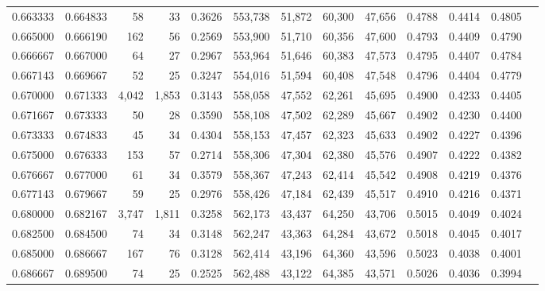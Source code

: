 \begin{tabular}{rrrrrrrrrrrrr}
0.663333 & 0.664833 &     58 &    33 &                                     0.3626 & 553,738 &  51,872 &  60,300 &  47,656 & 0.4788 & 0.4414 & 0.4805 \\
0.665000 & 0.666190 &    162 &    56 &                                     0.2569 & 553,900 &  51,710 &  60,356 &  47,600 & 0.4793 & 0.4409 & 0.4790 \\
0.666667 & 0.667000 &     64 &    27 &                                     0.2967 & 553,964 &  51,646 &  60,383 &  47,573 & 0.4795 & 0.4407 & 0.4784 \\
0.667143 & 0.669667 &     52 &    25 &                                     0.3247 & 554,016 &  51,594 &  60,408 &  47,548 & 0.4796 & 0.4404 & 0.4779 \\
0.670000 & 0.671333 &  4,042 & 1,853 &                                     0.3143 & 558,058 &  47,552 &  62,261 &  45,695 & 0.4900 & 0.4233 & 0.4405 \\
0.671667 & 0.673333 &     50 &    28 &                                     0.3590 & 558,108 &  47,502 &  62,289 &  45,667 & 0.4902 & 0.4230 & 0.4400 \\
0.673333 & 0.674833 &     45 &    34 &                                     0.4304 & 558,153 &  47,457 &  62,323 &  45,633 & 0.4902 & 0.4227 & 0.4396 \\
0.675000 & 0.676333 &    153 &    57 &                                     0.2714 & 558,306 &  47,304 &  62,380 &  45,576 & 0.4907 & 0.4222 & 0.4382 \\
0.676667 & 0.677000 &     61 &    34 &                                     0.3579 & 558,367 &  47,243 &  62,414 &  45,542 & 0.4908 & 0.4219 & 0.4376 \\
0.677143 & 0.679667 &     59 &    25 &                                     0.2976 & 558,426 &  47,184 &  62,439 &  45,517 & 0.4910 & 0.4216 & 0.4371 \\
0.680000 & 0.682167 &  3,747 & 1,811 &                                     0.3258 & 562,173 &  43,437 &  64,250 &  43,706 & 0.5015 & 0.4049 & 0.4024 \\
0.682500 & 0.684500 &     74 &    34 &                                     0.3148 & 562,247 &  43,363 &  64,284 &  43,672 & 0.5018 & 0.4045 & 0.4017 \\
0.685000 & 0.686667 &    167 &    76 &                                     0.3128 & 562,414 &  43,196 &  64,360 &  43,596 & 0.5023 & 0.4038 & 0.4001 \\
0.686667 & 0.689500 &     74 &    25 &                                     0.2525 & 562,488 &  43,122 &  64,385 &  43,571 & 0.5026 & 0.4036 & 0.3994 \\

\end{tabular}
